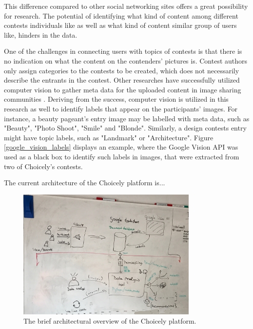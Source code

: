     This difference compared to other social networking sites offers a great possibility for research. The potential of identifying what kind of content among different contests individuals like as well as what kind of content similar group of users like, hinders in the data.    

    One of the challenges in connecting users with topics of contests is that there is no indication on what the content on the contenders' pictures is. Contest authors only assign categories to the contests to be created, which does not necessarily describe the entrants in the contest. Other researches have successfully utilized computer vision to gather meta data for the uploaded content in image sharing communities \cite{bakhshi2014faces, hu2014we}. Deriving from the success, computer vision is utilized in this research as well to identify labels that appear on the participants' images. For instance, a beauty pageant's entry image may be labelled with meta data, such as "Beauty", "Photo Shoot", "Smile" and "Blonde". Similarly, a design contests entry might have topic labels, such as "Landmark" or "Architecture". Figure \ref{google_vision_labels} displays an example, where the Google Vision API was used as a black box to identify such labels in images, that were extracted from two of Choicely's contests.
    
    The current architecture of the Choicely platform is...
    \begin{figure}[h] 
		\begin{center}
            \includegraphics[width=0.8\textwidth]{Images/architecture_whiteboard.jpg}
			\caption{The brief architectural overview of the Choicely platform.}
			\label{choicely_architecture}
		\end{center}
    \end{figure}

